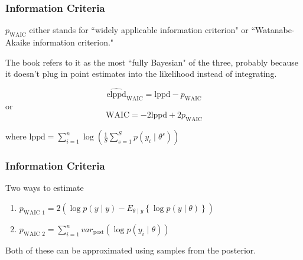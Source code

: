 \documentclass{beamer}
\begin{document}
\begin{frame}
\frametitle{Information Criteria}

$p_{\text{WAIC}}$ either stands for ``widely applicable information criterion" or ``Watanabe-Akaike information criterion." 
\newline

The book refers to it as the most ``fully Bayesian" of the three, probably because it doesn't plug in point estimates into the likelihood instead of integrating.

\[
\widehat{\text{elppd}}_{\text{WAIC}} = \text{lppd} - p_{\text{WAIC}}
\]
or
\[
\text{WAIC} = -2\text{lppd} + 2 p_{\text{WAIC}}
\]

where $ \text{lppd} = \sum_{i=1}^n \log \left(\frac{1}{S}\sum_{s=1}^S p(y_i \mid \theta^s) \right)$

\end{frame}

\begin{frame}
\frametitle{Information Criteria}

Two ways to estimate 

\begin{enumerate}
\item $p_{\text{WAIC 1}} = 2\left( \log p(y \mid y) - E_{\theta \mid y} \left\{  \log p(y \mid \theta) \right\} \right)$
\item $p_{\text{WAIC 2}} = \sum_{i=1}^n var_{\text{post}}(\log p(y_i \mid \theta))$
\end{enumerate}

Both of these can be approximated using samples from the posterior.

\end{frame}
\end{document}
